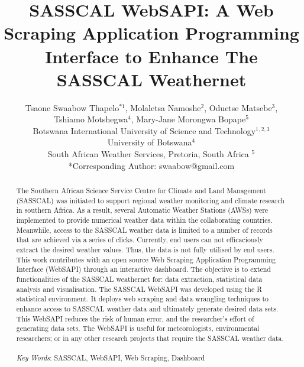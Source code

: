 \documentclass[a4paper, 10pt, conference]{ieeeconf}      %
\title{ \bf SASSCAL WebSAPI: A Web Scraping Application Programming Interface to Enhance The SASSCAL Weathernet
}
\author{Tsaone Swaabow Thapelo$^{*1}$,  Molaletsa Namoshe$^{2}$,  Oduetse Matsebe$^3$,\\
Tshiamo Motshegwa$^4$, Mary-Jane Morongwa Bopape$^5$  \\
	Botswana International University of Science and Technology$^{1,2,3}$\\
		University of Botswana$^4$\\
			South African Weather Services, Pretoria, South Africa $^{5}$ \\
		{*\color{black}Corresponding Author}: {\color{black}swaabow@gmail.com}
}
\begin{document}
\maketitle
\thispagestyle{empty}
\pagestyle{empty}


\begin{abstract}
\noindent
The Southern African Science Service Centre for Climate and Land Management (SASSCAL)  was initiated to support regional weather monitoring and climate research  in southern Africa.
As a result, several Automatic Weather Stations (AWSs) were implemented to provide numerical weather data within the collaborating countries. 
 Meanwhile, access to the SASSCAL weather data is limited to a number of records that are achieved via a series of clicks. 
 Currently, end users can  not efficaciously extract the desired weather values. 
Thus, the data is not fully utilised by end users. %
 This work  contributes with an open source Web Scraping Application Programming Interface (WebSAPI) through an interactive dashboard. 
 The objective is to extend functionalities of the SASSCAL weathernet for: data extraction, statistical data analysis and visualisation. %
  The SASSCAL WebSAPI    was developed using the R statistical environment. 
  It deploys  web scraping and data wrangling techniques to enhance access to SASSCAL weather data and  ultimately generate desired data sets.  
 This WebSAPI reduces the risk of human error, and the researcher's effort of generating data sets.  %
  The WebSAPI is   useful for meteorologists, environmental researchers; or in any other research projects that require   the SASSCAL weather data.  %
\\
\\
\emph{Key Words}:  SASSCAL,  WebSAPI, Web Scraping, Dashboard
\end{abstract}

\end{document}
